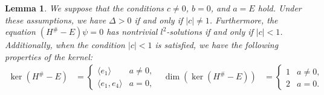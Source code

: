 \documentclass{amsart}
\newtheorem{lem}[thm]{Lemma}
\theoremstyle{definition}
\theoremstyle{remark}
\begin{document}
\begin{lem}\label{lem:6.5}
We suppose that the conditions \(c \neq 0\), \(b = 0\), and \(a = E\) hold. Under these assumptions, we have \(\Delta > 0\) if and only if \(|c| \neq 1\). Furthermore, the equation \((H^\# - E)\psi = 0\) has nontrivial \(l^2\)-solutions if and only if \(|c| < 1\). Additionally, when the condition \(|c| < 1\) is satisfied, we have the following properties of the kernel:
\begin{align*}
\ker(H^\# - E) &=
\begin{cases}
\langle e_1 \rangle & a \neq 0, \\
\langle e_1, e_4 \rangle & a = 0,
\end{cases}
&
\dim(\ker(H^\# - E)) &=
\begin{cases}
1 & a \neq 0, \\
2 & a = 0.
\end{cases}
\end{align*}
\end{lem}
\end{document}
